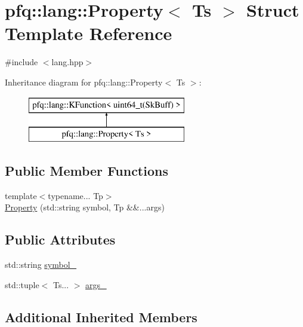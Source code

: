 \hypertarget{structpfq_1_1lang_1_1Property}{}\section{pfq\+:\+:lang\+:\+:Property$<$ Ts $>$ Struct Template Reference}
\label{structpfq_1_1lang_1_1Property}


{\ttfamily \#include $<$lang.\+hpp$>$}

Inheritance diagram for pfq\+:\+:lang\+:\+:Property$<$ Ts $>$\+:\begin{figure}[H]
\begin{center}
\leavevmode
\includegraphics[height=2.000000cm]{structpfq_1_1lang_1_1Property}
\end{center}
\end{figure}
\subsection*{Public Member Functions}
\begin{DoxyCompactItemize}
\item 
{\footnotesize template$<$typename... Tp$>$ }\\\hyperlink{structpfq_1_1lang_1_1Property_a65d215ea79feeaf43feaa02f3c8a31a4}{Property} (std\+::string symbol, Tp \&\&...args)
\end{DoxyCompactItemize}
\subsection*{Public Attributes}
\begin{DoxyCompactItemize}
\item 
std\+::string \hyperlink{structpfq_1_1lang_1_1Property_a27cdbc97fd6ffc8b92ff75599c7dce72}{symbol\+\_\+}
\item 
std\+::tuple$<$ Ts... $>$ \hyperlink{structpfq_1_1lang_1_1Property_a01e0bf793226860cbafe4bea5075d507}{args\+\_\+}
\end{DoxyCompactItemize}
\subsection*{Additional Inherited Members}


